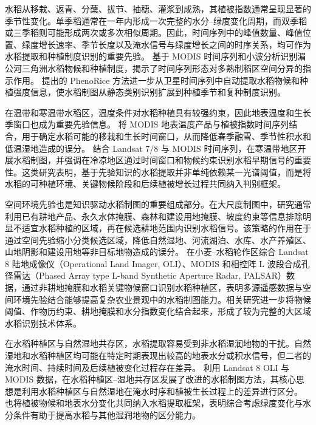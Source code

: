 水稻从移栽、返青、分蘖、拔节、抽穗、灌浆到成熟，其植被指数通常呈现显著的季节性变化。单季稻通常在一年内形成一次完整的水分--绿度变化周期，而双季稻或三季稻则可能形成两次或多次相似周期。因此，时间序列中的峰值数量、峰值位置、绿度增长速率、季节长度以及淹水信号与绿度增长之间的时序关系，均可作为水稻提取和种植制度识别的重要先验。\citet{Sakamoto2006RSE} 基于 MODIS 时间序列和小波分析识别湄公河三角洲水稻物候和种植制度，揭示了时间序列形态对多熟制稻区空间分异的指示作用。\citet{Boschetti2017RSE} 提出的 PhenoRice 方法进一步从卫星时间序列中自动提取水稻物候和种植强度信息，使水稻制图从静态类别识别扩展到种植季节和复种制度识别。

在温带和寒温带水稻区，温度条件对水稻种植具有较强约束，因此地表温度和生长季窗口也成为重要先验信息。\citet{Zhang2015ISPRS} 将 MODIS 地表温度产品与植被指数时间序列结合，用于确定水稻可能的移栽和生长时间窗口，从而降低春季融雪、季节性积水和低温湿地造成的误分。\citet{Qin2015ISPRS} 结合 Landsat 7/8 与 MODIS 时间序列，在寒温带地区开展水稻制图，并强调在冷凉地区通过时间窗口和物候约束识别水稻早期信号的重要性。这类研究表明，基于先验知识的水稻提取并非单纯依赖某一光谱阈值，而是将水稻的可种植环境、关键物候阶段和后续植被增长过程共同纳入判别框架。

空间环境先验也是知识驱动水稻制图的重要组成部分。在大尺度制图中，研究通常利用已有耕地产品、永久水体掩膜、森林和建设用地掩膜、坡度约束等信息排除明显不适宜水稻种植的区域，再在候选耕地范围内识别水稻信号。该策略的作用在于通过空间先验缩小分类候选区域，降低自然湿地、河流湖泊、水库、水产养殖区、山地阴影和建设用地等非目标地物造成的误分。\citet{Wang2015SciRep} 在小麦--水稻轮作区综合 Landsat 8 陆地成像仪（Operational Land Imager, OLI）、MODIS 和相控阵 L 波段合成孔径雷达（Phased Array type L-band Synthetic Aperture Radar, PALSAR）数据，通过非耕地掩膜和水稻关键物候窗口识别水稻种植区，表明多源遥感数据与空间环境先验结合能够提高复杂农业景观中的水稻制图能力。相关研究进一步将物候阈值、作物历约束、耕地掩膜和水分指数变化结合起来，形成了较为完整的大区域水稻识别技术体系\cite{Son2014,Gumma2014}。

在水稻种植区与自然湿地共存区，水稻提取容易受到非水稻湿润地物的干扰。自然湿地和水稻种植区均可能在特定时期表现出较高的地表水分或积水信号，但二者的淹水时间、持续时间及后续植被变化过程存在差异。\citet{Zhou2016IJAEO} 利用 Landsat 8 OLI 与 MODIS 数据，在水稻种植区--湿地共存区发展了改进的水稻制图方法，其核心思想是利用水稻种植区与自然湿地在淹水时序和植被生长过程上的差异进行区分。\citet{Qiu2015EcoIndic} 也将植被物候和地表水分变化共同纳入水稻提取框架，表明综合考虑绿度变化与水分条件有助于提高水稻与其他湿润地物的区分能力。

